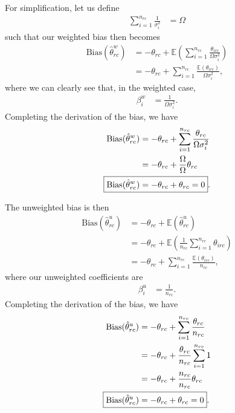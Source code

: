 \documentclass[12pt]{article}
\begin{document}
\begin{enumerate}[label=(\alph*)]
    For simplification, let us define
    \begin{align}\label{eqn:omega}
        \sum_{i=1}^{n_{rc}}\frac{1}{\sigma_i^2}&=\Omega
    \end{align}
    such that our weighted bias then becomes
    \begin{align*}
        \text{Bias}(\hat\theta_{rc}^w)&=-\theta_{rc}+\mathbb E\left(\sum_{i=1}^{n_{rc}}\frac{\theta_{irc}}{\Omega\sigma_i^2}\right)\\
        &=-\theta_{rc}+\sum_{i=1}^{n_{rc}}\frac{\mathbb E(\theta_{irc})}{\Omega\sigma_i^2},
    \end{align*}
    where we can clearly see that, in the weighted case,
    \begin{align}\label{eqn:bw}
        \beta_i^w&=\frac{1}{\Omega\sigma_i^2}.
    \end{align}
    Completing the derivation of the bias, we have
    \begin{align*}
        \text{Bias}(\hat\theta_{rc}^w)&=-\theta_{rc}+\sum_{i=1}^{n_{rc}}\frac{\theta_{rc}}{\Omega\sigma_i^2}\\
        &=-\theta_{rc}+\frac{\Omega}{\Omega}\theta_{rc}\\
        \Aboxed{\text{Bias}(\hat\theta_{rc}^w)&=-\theta_{rc}+\theta_{rc}=0}.
    \end{align*}
    
    The unweighted bias is then
    \begin{align*}
        \text{Bias}(\hat\theta_{rc}^u)&=-\theta_{rc}+\mathbb E(\hat\theta_{rc}^u)\\
        &=-\theta_{rc}+\mathbb E\left(\frac{1}{n_{rc}}\sum_{i=1}^{n_{rc}}\theta_{irc}\right)\\
        &=-\theta_{rc}+\sum_{i=1}^{n_{rc}}\frac{\mathbb E(\theta_{irc})}{n_{rc}},
    \end{align*}
    where our unweighted coefficients are
    \begin{align}\label{eqn:bu}
        \beta_i^u&=\frac{1}{n_{rc}}.
    \end{align}
    Completing the derivation of the bias, we have
    \begin{align*}
        \text{Bias}(\hat\theta_{rc}^u)&=-\theta_{rc}+\sum_{i=1}^{n_{rc}}\frac{\theta_{rc}}{n_{rc}}\\
        &=-\theta_{rc}+\frac{\theta_{rc}}{n_{rc}}\sum_{i=1}^{n_{rc}}1\\
        &=-\theta_{rc}+\frac{n_{rc}}{n_{rc}}\theta_{rc}\\
        \Aboxed{\text{Bias}(\hat\theta_{rc}^u)&=-\theta_{rc}+\theta_{rc}=0}.
    \end{align*}


\end{enumerate}
\end{document}
